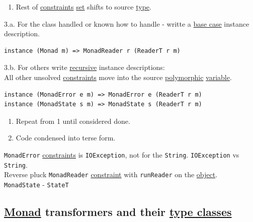 \documentclass[11pt]{article}
\begin{document}
\begin{enumerate}
\item Rest of \hyperref[org76311a9]{constraints} \hyperref[orgbed80ba]{set} shifts to source \hyperref[org4fbaeb8]{type}.\\
\end{enumerate}

3.a. For the class handled or known how to handle - writte a \hyperref[org0e15f55]{base case} instance description.\\

\begin{verbatim}
instance (Monad m) => MonadReader r (ReaderT r m)
\end{verbatim}

3.b. For others write \hyperref[org06bac4d]{recursive} instance descriptions:\\

All other unsolved \hyperref[org76311a9]{constraints} move into the source \hyperref[org84d7fee]{polymorphic} \hyperref[org301bab5]{variable}.\\

\begin{verbatim}
instance (MonadError e m) => MonadError e (ReaderT r m)
instance (MonadState s m) => MonadState s (ReaderT r m)
\end{verbatim}

\begin{enumerate}
\item Repeat from 1 until considered done.\\

\item Code condensed into terse form.\\
\end{enumerate}

\texttt{MonadError} \hyperref[org76311a9]{constraints} is \texttt{IOException}, not for the \texttt{String}. \texttt{IOException} vs \texttt{String}.\\

Reverse pluck \texttt{MonadReader} \hyperref[org7bec652]{constraint} with \texttt{runReader} on the \hyperref[org025aac8]{object}.\\

\texttt{MonadState} - \texttt{StateT}\\

\subsection{\hyperref[org268aaf1]{Monad} transformers and their \hyperref[org2efac60]{type classes}}
\label{sec:org8f1699c}
\end{document}
